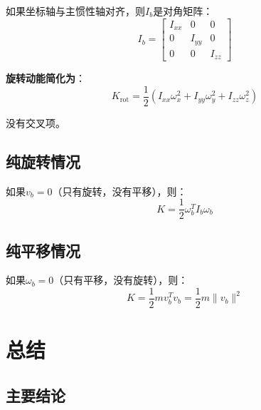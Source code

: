 \documentclass[12pt,a4paper]{article}
\begin{document}
如果坐标轴与主惯性轴对齐，则$I_b$是对角矩阵：
\begin{equation}
I_b = \begin{bmatrix}
I_{xx} & 0 & 0 \\
0 & I_{yy} & 0 \\
0 & 0 & I_{zz}
\end{bmatrix}
\end{equation}

\textbf{旋转动能简化为}：
\begin{equation}
K_{\text{rot}} = \frac{1}{2}(I_{xx}\omega_x^2 + I_{yy}\omega_y^2 + I_{zz}\omega_z^2)
\end{equation}

没有交叉项。

\subsection{纯旋转情况}

如果$v_b = 0$（只有旋转，没有平移），则：
\begin{equation}
K = \frac{1}{2}\omega_b^T I_b \omega_b
\end{equation}

\subsection{纯平移情况}

如果$\omega_b = 0$（只有平移，没有旋转），则：
\begin{equation}
K = \frac{1}{2}mv_b^T v_b = \frac{1}{2}m\|v_b\|^2
\end{equation}

\section{总结}

\subsection{主要结论}
\end{document}
